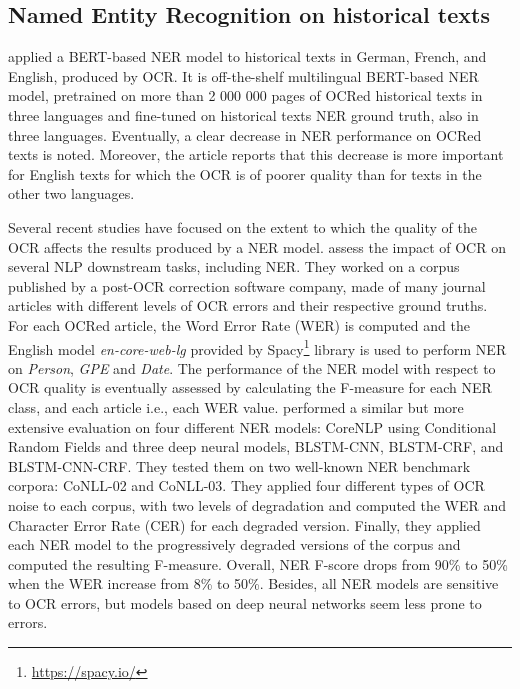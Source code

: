 \subsection{Named Entity Recognition on historical texts}

\cite{Labusch2020NamedED} applied a BERT-based NER model to historical texts in German, French, and English, produced by OCR. It is off-the-shelf multilingual BERT-based NER model, pretrained on more than 2 000 000 pages of OCRed historical texts in three languages and fine-tuned on historical texts NER ground truth, also in three languages. Eventually, a clear decrease in NER performance on OCRed texts is noted. Moreover, the article reports that this decrease is more important for English texts for which the OCR is of poorer quality than for texts in the other two languages. 

Several recent studies have focused on the extent to which the quality of the OCR affects the results produced by a NER model.\cite{van2020assessing} assess the impact of OCR on several NLP downstream tasks, including NER. They worked on a corpus published by a post-OCR correction software company, made of many journal articles with different levels of OCR errors and their respective ground truths. For each OCRed article, the Word Error Rate (WER) is computed and the English model \textit{en-core-web-lg} provided by Spacy\footnote{\url{https://spacy.io/}} library is used to perform NER on \textit{Person}, \textit{GPE} and \textit{Date}. The performance of the NER model with respect to OCR quality is eventually assessed by calculating the F-measure for each NER class, and each article i.e., each WER value. \cite{hamdi2020assessing} performed a similar but more extensive evaluation on four different NER models: CoreNLP using Conditional Random Fields and three deep neural models, BLSTM-CNN, BLSTM-CRF, and BLSTM-CNN-CRF. They tested them on two well-known NER benchmark corpora: CoNLL-02 and CoNLL-03. They applied four different types of OCR noise to each corpus, with two levels of degradation and computed the WER and Character Error Rate (CER) for each degraded version. Finally, they applied each NER model to the progressively degraded versions of the corpus and computed the resulting F-measure. Overall, NER F-score drops from 90\% to 50\% when the WER increase from 8\% to 50\%. Besides, all NER models are sensitive to OCR errors, but models based on deep neural networks seem less prone to errors.

